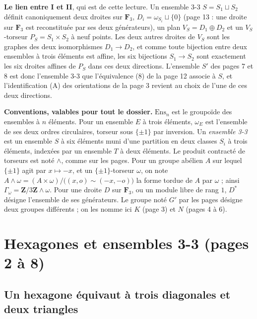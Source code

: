 \documentclass[11pt,a4paper]{article}
\begin{document}
\textbf{Le lien entre I et II}, qui est de cette lecture. Un ensemble 3-3
$S = S_1 \sqcup S_2$ définit canoniquement deux droites sur $\mathbf{F}_3$,
$D_i = \omega_{S_i} \sqcup \{0\}$ (page 13 : une droite sur $\mathbf{F}_3$ est
reconstituée par ses deux générateurs), un plan $V_S = D_1 \oplus D_2$ et un
$V_S$-torseur $P_S = S_1 \times S_2$ à neuf points. Les deux autres droites de
$V_S$ sont les graphes des deux isomorphismes $D_1 \to D_2$, et comme toute
bijection entre deux ensembles à trois éléments est affine, les six bijections
$S_1 \to S_2$ sont exactement les six droites affines de $P_S$ dans ces deux
directions. L'ensemble $S'$ des pages 7 et 8 est donc l'ensemble 3-3 que
l'équivalence (8) de la page 12 associe à $S$, et l'identification (A) des
orientations de la page 3 revient au choix de l'une de ces deux directions.

\textbf{Conventions, valables pour tout le dossier.} $\mathrm{Ens}_n$ est le
groupoïde des ensembles à $n$ éléments. Pour un ensemble $E$ à trois éléments,
$\omega_E$ est l'ensemble de ses deux ordres circulaires, torseur sous
$\{\pm 1\}$ par inversion. Un \emph{ensemble 3-3} est un ensemble $S$ à six
éléments muni d'une partition en deux classes $S_i$ à trois éléments, indexées
par un ensemble $T$ à deux éléments. Le produit contracté de torseurs est noté
$\wedge$, comme sur les pages. Pour un groupe abélien $A$ sur lequel $\{\pm 1\}$
agit par $x \mapsto -x$, et un $\{\pm 1\}$-torseur $\omega$, on note
$A \wedge \omega = (A \times \omega)/\bigl((x, o) \sim (-x, -o)\bigr)$ la forme
tordue de $A$ par $\omega$ ; ainsi $\Gamma_\omega = \mathbf{Z}/3\mathbf{Z} \wedge \omega$.
Pour une droite $D$ sur $\mathbf{F}_3$, ou un module libre de rang $1$, $D^{*}$
désigne l'ensemble de ses générateurs. Le groupe noté $G'$ par les pages
désigne deux groupes différents ; on les nomme ici $K$ (page 3) et $N$ (pages 4
à 6).

\section*{Hexagones et ensembles 3-3 (pages 2 à 8)}

\subsection*{Un hexagone équivaut à trois diagonales et deux triangles}
\end{document}
